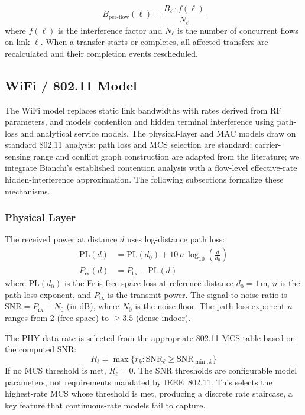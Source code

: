 \documentclass[conference]{IEEEtran}
\begin{document}
\begin{equation}
B_\text{per-flow}(\ell) = \frac{B_\ell \cdot f(\ell)}{N_\ell}
\label{eq:fair_share}
\end{equation}
where $f(\ell)$ is the interference factor and $N_\ell$ is the number of
concurrent flows on link $\ell$.  When a transfer starts or completes, all
affected transfers are recalculated and their completion events rescheduled.

\subsection{WiFi / 802.11 Model}
\label{sec:wifi}

The WiFi model replaces static link bandwidths with rates derived from RF
parameters, and models contention and hidden terminal interference using
path-loss and analytical service models. The physical-layer and MAC models
draw on standard 802.11 analysis: path loss and MCS selection are standard;
carrier-sensing range and conflict graph construction are adapted from the
literature; we integrate Bianchi's established contention analysis with a
flow-level effective-rate hidden-interference approximation.
The following subsections formalize these mechanisms.

\subsubsection{Physical Layer}

The received power at distance $d$ uses log-distance path loss:
\begin{align}
\text{PL}(d) &= \text{PL}(d_0) + 10\,n\,\log_{10}\!\left(\frac{d}{d_0}\right) \label{eq:pathloss} \\
P_\text{rx}(d) &= P_\text{tx} - \text{PL}(d) \label{eq:rxpower}
\end{align}
where $\text{PL}(d_0)$ is the Friis free-space loss at reference distance
$d_0 = 1$\,m, $n$ is the path loss exponent, and $P_\text{tx}$ is the
transmit power.  The signal-to-noise ratio is $\text{SNR} = P_\text{rx} - N_0$
(in dB), where $N_0$ is the noise floor.  The path loss exponent $n$ ranges from 2 (free-space) to $\geq 3.5$
(dense indoor).

The PHY data rate is selected from the appropriate 802.11 MCS table based
on the computed SNR:
\begin{equation}
R_\ell = \max\{r_k : \text{SNR}_\ell \geq \text{SNR}_{\min,k}\}
\label{eq:mcs}
\end{equation}
If no MCS threshold is met, $R_\ell=0$.
The SNR thresholds are configurable model parameters, not requirements
mandated by IEEE~802.11. This selects the highest-rate MCS whose threshold is met,
producing a discrete rate staircase, a key feature that continuous-rate
models fail to capture.
\end{document}
